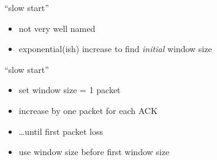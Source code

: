 \begin{frame}{``slow start''}
    \begin{itemize}
    \item not very well named
    \vspace{.5cm}
    \item exponential(ish) increase to find \textit{initial} window size
    \end{itemize}
\end{frame}

\begin{frame}{``slow start''}
    \begin{itemize}
    \item set window size = 1 packet
    \item increase by one packet for each ACK
    \item \ldots until first packet loss
    \item use window size before first window size
    \end{itemize}
\end{frame}

